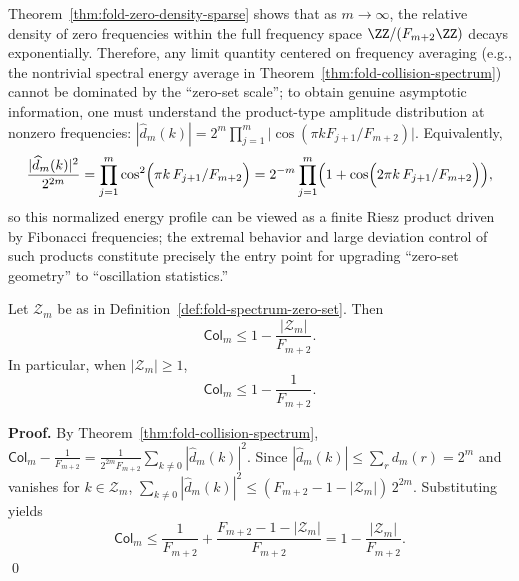 \begin{remark}\label{rem:fold-zero-sparse-necessity}
Theorem~\ref{thm:fold-zero-density-sparse} shows that as \(m\to\infty\), the relative density of zero frequencies within the full frequency space \(\ZZ/(F_{m+2}\ZZ)\) decays exponentially.
Therefore, any limit quantity centered on frequency averaging (e.g., the nontrivial spectral energy average in Theorem~\ref{thm:fold-collision-spectrum}) cannot be dominated by the ``zero-set scale'';
to obtain genuine asymptotic information, one must understand the product-type amplitude distribution at nonzero frequencies:
\(
|\widehat d_m(k)|=2^m\prod_{j=1}^m\bigl|\cos(\pi kF_{j+1}/F_{m+2})\bigr|
\).
Equivalently,
\[
\frac{|\widehat d_m(k)|^2}{2^{2m}}
=\prod_{j=1}^m\cos^2\Bigl(\pi k\,F_{j+1}/F_{m+2}\Bigr)
=2^{-m}\prod_{j=1}^m\Bigl(1+\cos\Bigl(2\pi k\,F_{j+1}/F_{m+2}\Bigr)\Bigr),
\]
so this normalized energy profile can be viewed as a finite Riesz product driven by Fibonacci frequencies; the extremal behavior and large deviation control of such products constitute precisely the entry point for upgrading ``zero-set geometry'' to ``oscillation statistics.''
\end{remark}

\begin{theorem}
\label{thm:fold-collision-zero-reduction}
Let $\mathcal{Z}_m$ be as in Definition~\ref{def:fold-spectrum-zero-set}. Then
\[
\mathsf{Col}_m\le 1-\frac{|\mathcal{Z}_m|}{F_{m+2}}.
\]
In particular, when $|\mathcal{Z}_m|\ge 1$,
\[
\mathsf{Col}_m\le 1-\frac{1}{F_{m+2}}.
\]
\end{theorem}

\textbf{Proof.}
By Theorem~\ref{thm:fold-collision-spectrum},
\(
\mathsf{Col}_m-\frac{1}{F_{m+2}}=\frac{1}{2^{2m}F_{m+2}}\sum_{k\ne 0}|\widehat d_m(k)|^2
\).
Since $|\widehat d_m(k)|\le\sum_r d_m(r)=2^m$ and vanishes for $k\in\mathcal{Z}_m$,
\(
\sum_{k\ne 0}|\widehat d_m(k)|^2\le (F_{m+2}-1-|\mathcal{Z}_m|)\,2^{2m}
\).
Substituting yields
\[
\mathsf{Col}_m
\le
\frac{1}{F_{m+2}}+\frac{F_{m+2}-1-|\mathcal{Z}_m|}{F_{m+2}}
=1-\frac{|\mathcal{Z}_m|}{F_{m+2}}.
\]
\qed

